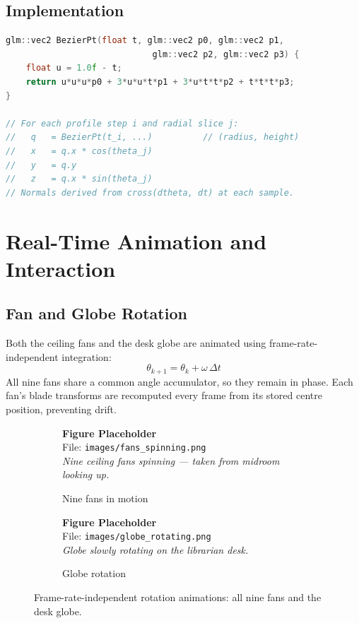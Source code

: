 \documentclass[12pt, a4paper]{article}
\newcommand{\imgph}[2]{%
    \begin{mdframed}[backgroundcolor=lightblue!60, linecolor=sectionblue,
                     linewidth=1pt, roundcorner=4pt, innertopmargin=8pt,
                     innerbottommargin=8pt]
        \centering
        {\bfseries\color{sectionblue} Figure Placeholder}\\[4pt]
        File: \texttt{#1}\\[3pt]
        {\small\itshape #2}
    \end{mdframed}%
}
\begin{document}
\subsection{Implementation}

\begin{lstlisting}[language=C++, caption={Core Bezier point evaluation and revolved mesh sketch}]
glm::vec2 BezierPt(float t, glm::vec2 p0, glm::vec2 p1,
                             glm::vec2 p2, glm::vec2 p3) {
    float u = 1.0f - t;
    return u*u*u*p0 + 3*u*u*t*p1 + 3*u*t*t*p2 + t*t*t*p3;
}

// For each profile step i and radial slice j:
//   q   = BezierPt(t_i, ...)          // (radius, height)
//   x   = q.x * cos(theta_j)
//   y   = q.y
//   z   = q.x * sin(theta_j)
// Normals derived from cross(dtheta, dt) at each sample.
\end{lstlisting}

\section{Real-Time Animation and Interaction}

\subsection{Fan and Globe Rotation}

Both the ceiling fans and the desk globe are animated using frame-rate-independent integration:
\begin{equation}
    \theta_{k+1} = \theta_k + \omega\,\Delta t
    \label{eq:fanupdate}
\end{equation}
All nine fans share a common angle accumulator, so they remain in phase. Each fan's blade transforms are recomputed every frame from its stored centre position, preventing drift.

\begin{figure}[H]
    \centering
    \begin{subfigure}{0.47\textwidth}
        \imgph{images/fans_spinning.png}{Nine ceiling fans spinning — taken from midroom looking up.}
        \caption{Nine fans in motion}
    \end{subfigure}\hfill
    \begin{subfigure}{0.47\textwidth}
        \imgph{images/globe_rotating.png}{Globe slowly rotating on the librarian desk.}
        \caption{Globe rotation}
    \end{subfigure}
    \caption{Frame-rate-independent rotation animations: all nine fans and the desk globe.}
    \label{fig:animations}
\end{figure}
\end{document}
